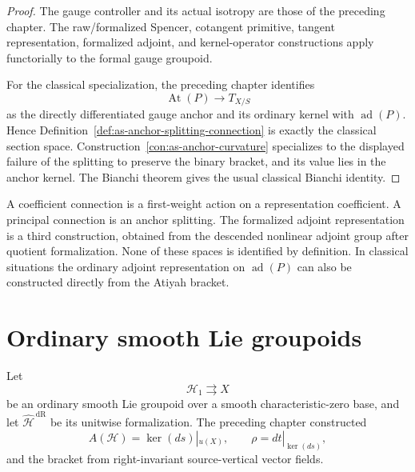 \begin{proof}
The gauge controller and its actual isotropy are those of the preceding
chapter.  The raw/formalized Spencer, cotangent primitive, tangent
representation, formalized adjoint, and kernel-operator constructions apply
functorially to the formal gauge groupoid.

For the classical specialization, the preceding chapter identifies
\[
    \operatorname{At}(P)\longrightarrow T_{X/S}
\]
as the directly differentiated gauge anchor and its ordinary kernel with
$\operatorname{ad}(P)$.  Hence
Definition~\ref{def:as-anchor-splitting-connection} is exactly the classical
section space.  Construction~\ref{con:as-anchor-curvature} specializes to
the displayed failure of the splitting to preserve the binary bracket, and
its value lies in the anchor kernel.  The Bianchi theorem gives the usual
classical Bianchi identity.
\end{proof}

\begin{remark}
A coefficient connection is a first-weight action on a representation
coefficient.  A principal connection is an anchor splitting.  The
formalized adjoint representation is a third construction, obtained from the
descended nonlinear adjoint group after quotient formalization.  None of
these spaces is identified by definition.  In classical situations the
ordinary adjoint representation on $\operatorname{ad}(P)$ can also be
constructed directly from the Atiyah bracket.
\end{remark}

\section{Ordinary smooth Lie groupoids}
\label{sec:as-classical}

Let
\[
    \mathcal H_1\rightrightarrows X
\]
be an ordinary smooth Lie groupoid over a smooth characteristic-zero base,
and let
$\widehat{\mathcal H}^{\,\mathrm{dR}}$
be its unitwise formalization.  The preceding chapter constructed
\[
    A(\mathcal H)
    =
    \ker(ds)|_{u(X)},
    \qquad
    \rho
    =
    dt|_{\ker(ds)},
\]
and the bracket from right-invariant source-vertical vector fields.

